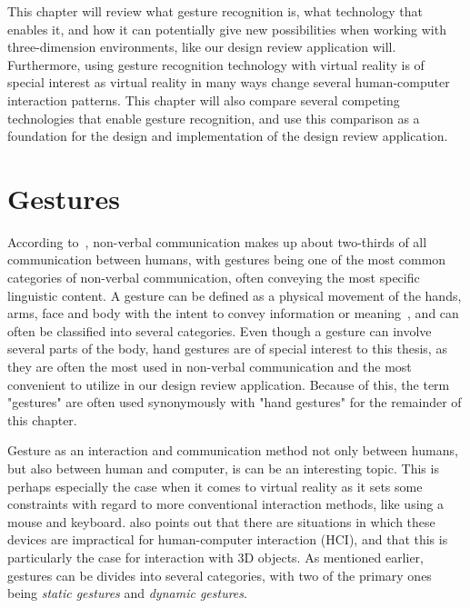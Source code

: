 This chapter will review what gesture recognition is, what technology that enables it, and how it can potentially give new possibilities when working
with three-dimension environments, like our design review application will. Furthermore, using gesture recognition technology with virtual reality is 
of special interest as virtual reality in many ways change several human-computer interaction patterns. This chapter will also compare several competing 
technologies that enable gesture recognition, and use this comparison as a foundation for the design and implementation of the design review application.  

\section{Gestures}
According to~\citet{Hogan2003}, non-verbal communication makes up about two-thirds of all communication between humans, with gestures being one of the most common 
categories of non-verbal communication, often conveying the most specific linguistic content.
A gesture can be defined as a physical movement of the hands, arms, face and body with the intent to convey information or meaning~\citep{Mitra2007}, 
and can often be classified into several categories. Even though 
a gesture can involve several parts of the body, hand gestures are of special interest to this thesis, as they are often the most used in non-verbal communication
and the most convenient to utilize in our design review application. 
Because of this, the term "gestures" are often used synonymously with "hand gestures" for the remainder of this chapter.

Gesture as an interaction and communication method not only between humans, but also between human and computer, is can be an interesting topic. 
This is perhaps especially the case when it comes to virtual reality as it sets some constraints with regard to more conventional interaction methods, like using 
a mouse and keyboard. \citet{Rautaray2015} also points out that there are situations in which
these devices are impractical for human-computer interaction (HCI), and that this is particularly the case for interaction with 3D objects.
As mentioned earlier, gestures can be divides into several categories, with two of the primary ones being \textit{static gestures} and \textit{dynamic gestures}.

